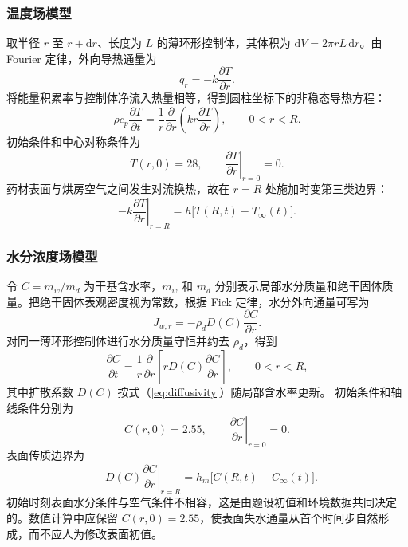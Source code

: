 \documentclass[withoutpreface,bwprint]{cumcmthesis}
\begin{document}
\subsubsection{温度场模型}

取半径 $r$ 至 $r+\mathrm{d}r$、长度为 $L$ 的薄环形控制体，其体积为 $\mathrm{d}V=2\pi rL\,\mathrm{d}r$。由 Fourier 定律，外向导热通量为
\begin{equation}
q_r=-k\frac{\partial T}{\partial r}.
\label{eq:fourier}
\end{equation}
将能量积累率与控制体净流入热量相等，得到圆柱坐标下的非稳态导热方程：
\begin{equation}
\rho c_p\frac{\partial T}{\partial t}
=\frac{1}{r}\frac{\partial}{\partial r}
\left(kr\frac{\partial T}{\partial r}\right),
\qquad 0<r<R.
\label{eq:heat_pde}
\end{equation}
初始条件和中心对称条件为
\begin{equation}
T(r,0)=28,\qquad
\left.\frac{\partial T}{\partial r}\right|_{r=0}=0.
\label{eq:heat_initial_center}
\end{equation}
药材表面与烘房空气之间发生对流换热，故在 $r=R$ 处施加时变第三类边界：
\begin{equation}
-k\left.\frac{\partial T}{\partial r}\right|_{r=R}
=h\bigl[T(R,t)-T_\infty(t)\bigr].
\label{eq:heat_robin}
\end{equation}

\subsubsection{水分浓度场模型}

令 $C=m_w/m_d$ 为干基含水率，$m_w$ 和 $m_d$ 分别表示局部水分质量和绝干固体质量。把绝干固体表观密度视为常数，根据 Fick 定律，水分外向通量可写为
\begin{equation}
J_{w,r}=-\rho_dD(C)\frac{\partial C}{\partial r}.
\label{eq:fick}
\end{equation}
对同一薄环形控制体进行水分质量守恒并约去 $\rho_d$，得到
\begin{equation}
\frac{\partial C}{\partial t}
=\frac{1}{r}\frac{\partial}{\partial r}
\left[rD(C)\frac{\partial C}{\partial r}\right],
\qquad 0<r<R,
\label{eq:moisture_pde}
\end{equation}
其中扩散系数 $D(C)$ 按式（\ref{eq:diffusivity}）随局部含水率更新。
初始条件和轴线条件分别为
\begin{equation}
C(r,0)=2.55,\qquad
\left.\frac{\partial C}{\partial r}\right|_{r=0}=0.
\label{eq:moisture_initial_center}
\end{equation}
表面传质边界为
\begin{equation}
-D(C)\left.\frac{\partial C}{\partial r}\right|_{r=R}
=h_m\bigl[C(R,t)-C_\infty(t)\bigr].
\label{eq:moisture_robin}
\end{equation}
初始时刻表面水分条件与空气条件不相容，这是由题设初值和环境数据共同决定的。数值计算中应保留 $C(r,0)=2.55$，使表面失水通量从首个时间步自然形成，而不应人为修改表面初值。
\end{document}
